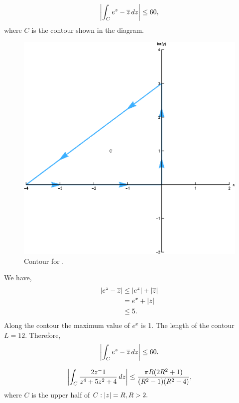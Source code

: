 \documentclass[12pt]{book}
\begin{document}
\begin{exmp}
    \[
        \left\lvert \int_{C} e^z - \overline{z}\,dz \right\rvert \leq 60, 
    \]
    where $C$ is the contour shown in the diagram. 
\end{exmp}
\begin{figure}[H]
    \centering
    \includegraphics[scale = 0.7]{./figs/chapter_2/ci_contour_ex_3.eps}
    \caption{Contour for .}
\end{figure}
We have, 
\begin{align*}
    \left\lvert e^z - \overline{z} \right\rvert
        &\leq
            \left\lvert e^z \right\rvert + \left\lvert \overline{z} \right\rvert \\
        &=
            e^x + \left\lvert z \right\rvert \\
        &\leq 
            5.
\end{align*}
Along the contour the maximum value of $e^x$ is 1. The length of the contour $L = 12.$ Therefore, 
    \[
        \left\lvert \int_{C} e^z - \overline{z}\,dz \right\rvert \leq 60.
    \]

\begin{exmp}
    \[
        \left\lvert \int_{C} \frac{2z^ - 1}{z^4 + 5z^2 + 4}\,dz \right\rvert \leq \frac{\pi R (2R^2 + 1)}{(R^2 - 1)(R^2 - 4)},
    \]
    where $C$ is the upper half of $C: \left\lvert z \right\rvert = R, R > 2.$
\end{exmp}
\end{document}
